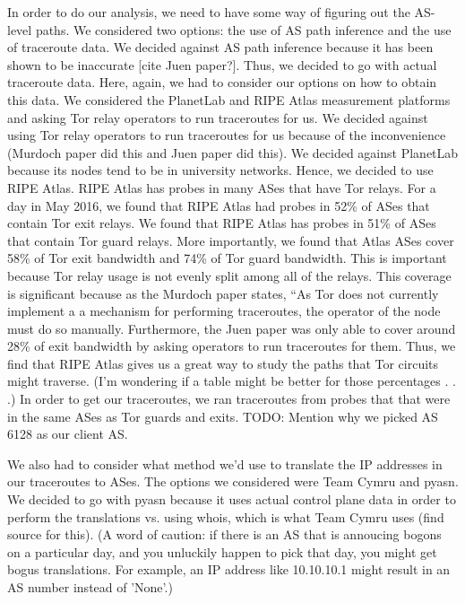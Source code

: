 In order to do our analysis, we need to have some way of figuring out the AS-level paths. 
We considered two options: the use of AS path inference and the use of traceroute data. 
We decided against AS path inference because it has been shown to be inaccurate [cite 
Juen paper?]. Thus, we decided to go with actual traceroute data. Here, again, we had 
to consider our options on how to obtain this data. We considered the PlanetLab and RIPE 
Atlas measurement platforms and asking Tor relay operators to run traceroutes for us. 
We decided against using Tor relay operators to run traceroutes for us because of the 
inconvenience (Murdoch paper did this and Juen paper did this). We decided against 
PlanetLab because its nodes tend to be in university networks. Hence, we decided to use 
RIPE Atlas. RIPE Atlas has probes in many ASes that have Tor relays. For a day in May 
2016, we found that RIPE Atlas had probes in 52\% of ASes that contain Tor exit relays. 
We found that RIPE Atlas has probes in 51\% of ASes that contain Tor guard relays. More 
importantly, we found that Atlas ASes cover 58\% of Tor exit bandwidth and 74\% of Tor 
guard bandwidth. This is important because Tor relay usage is not evenly split among 
all of the relays. This coverage is significant because as the Murdoch paper states, 
``As Tor does not currently implement a a mechanism for performing traceroutes, the 
operator of the node must do so manually. Furthermore, the Juen paper was only able to 
cover around 28\% of exit bandwidth by asking operators to run traceroutes for them. 
Thus, we find that RIPE Atlas gives us a great way to study the paths that Tor circuits 
might traverse. (I'm wondering if a table might be better for those percentages . . .)
In order to get our traceroutes, we ran traceroutes from probes that that were in the 
same ASes as Tor guards and exits. TODO: Mention why we picked AS 6128 as our client AS.

We also had to consider what method we'd use to translate the IP addresses in our 
traceroutes to ASes. The options we considered were Team Cymru and pyasn. We decided to 
go with pyasn because it uses actual control plane data in order to perform the 
translations vs. using whois, which is what Team Cymru uses (find source for this). 
(A word of caution: if there is an AS that is annoucing bogons on a particular day, and 
you unluckily happen to pick that day, you might get bogus translations. For example, an 
IP address like 10.10.10.1 might result in an AS number instead of 'None'.)

